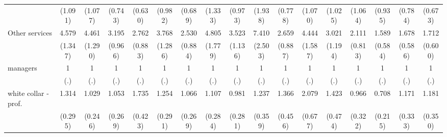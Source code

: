 {\begin{tabular}{l*{16}{c}}
                    &     (1.091)         &     (1.077)         &     (0.743)         &     (0.630)         &     (0.982)         &     (0.689)         &     (1.333)         &     (0.973)         &     (1.938)         &     (0.778)         &     (1.070)         &     (1.025)         &     (1.064)         &     (0.935)         &     (0.784)         &     (0.673)         \\
[1em]
Other services      &       4.579\sym{***}&       4.461\sym{***}&       3.195\sym{***}&       2.762\sym{**} &       3.768\sym{***}&       2.530\sym{**} &       4.805\sym{***}&       3.523\sym{***}&       7.410\sym{***}&       2.659\sym{**} &       4.444\sym{***}&       3.021\sym{**} &       2.111         &       1.589         &       1.678         &       1.712         \\
                    &     (1.347)         &     (1.290)         &     (0.966)         &     (0.883)         &     (1.286)         &     (0.884)         &     (1.779)         &     (1.136)         &     (2.503)         &     (0.887)         &     (1.587)         &     (1.194)         &     (0.813)         &     (0.584)         &     (0.586)         &     (0.600)         \\
[1em]
managers            &           1         &           1         &           1         &           1         &           1         &           1         &           1         &           1         &           1         &           1         &           1         &           1         &           1         &           1         &           1         &           1         \\
                    &         (.)         &         (.)         &         (.)         &         (.)         &         (.)         &         (.)         &         (.)         &         (.)         &         (.)         &         (.)         &         (.)         &         (.)         &         (.)         &         (.)         &         (.)         &         (.)         \\
[1em]
white collar - prof.&       1.314         &       1.029         &       1.053         &       1.735\sym{*}  &       1.254         &       1.066         &       1.107         &       0.981         &       1.237         &       1.366         &       2.079\sym{*}  &       1.423         &       0.966         &       0.708         &       1.171         &       1.181         \\
                    &     (0.295)         &     (0.246)         &     (0.269)         &     (0.423)         &     (0.291)         &     (0.269)         &     (0.284)         &     (0.281)         &     (0.359)         &     (0.456)         &     (0.677)         &     (0.474)         &     (0.322)         &     (0.215)         &     (0.333)         &     (0.350)         \\

\end{tabular}}
